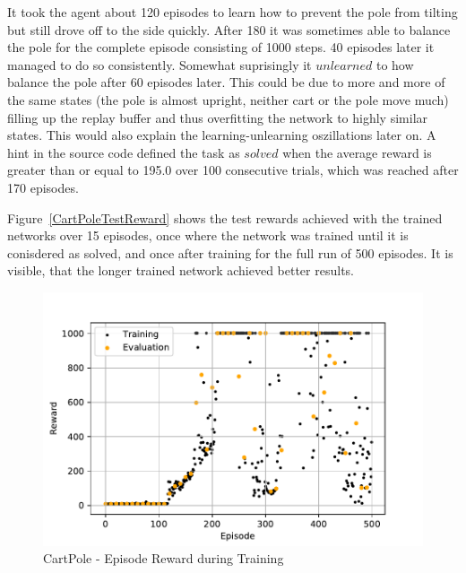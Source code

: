 \documentclass[
        a4paper,
        10pt,
        parskip = full,    %
    ]{scrartcl}
\begin{document}
It took the agent about 120 episodes to learn how to prevent the pole from tilting
but still drove off to the side quickly. After 180 it was sometimes able to
balance the pole for the complete episode consisting of 1000 steps. 40 episodes
later it managed to do so consistently. Somewhat suprisingly it $unlearned$ to
how balance the pole after 60 episodes later. This could be due to more and more
of the same states (the pole is almost upright, neither cart or the pole move much)
filling up the replay buffer and thus overfitting the network to highly similar
states. This would also explain the learning-unlearning oszillations later on.
A hint in the source code defined the task as $solved$ when the average reward is
greater than or equal to 195.0 over 100 consecutive trials, which was reached
after 170 episodes.

Figure~\ref{CartPoleTestReward} shows the test rewards achieved with the trained
networks over 15 episodes, once where the network was trained until it is
conisdered as solved, and once after training for the full run of 500 episodes.
It is visible, that the longer trained network achieved better results.

\begin{figure}[H]
  \begin{center}
    \includegraphics{./images/CartPole-v0/tb_train_eval_reward.pdf}
    \caption{CartPole - Episode Reward during Training}
    \label{CartPoleTrainEvalReward}
  \end{center}
\end{figure}
\end{document}
